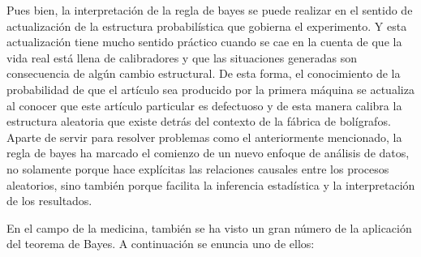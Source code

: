 \documentclass[10pt,openright]{book}\usepackage[]{graphicx}\usepackage[]{color}
\begin{document}
\begin{Eje}
Pues bien, la interpretación de la regla de bayes se puede realizar en el sentido de actualización de la estructura probabilística que gobierna el experimento. Y esta actualización tiene mucho sentido práctico cuando se cae en la cuenta de que la vida real está llena de calibradores y que las situaciones generadas son consecuencia de algún cambio estructural. De esta forma, el conocimiento de la probabilidad de que el artículo sea producido por la primera máquina se actualiza al conocer que este artículo particular es defectuoso y de esta manera calibra la estructura aleatoria que existe detrás del contexto de la fábrica de bolígrafos. Aparte de servir para resolver problemas como el anteriormente mencionado, la regla de bayes ha marcado el comienzo de un nuevo enfoque de análisis de datos, no solamente porque hace explícitas las relaciones causales entre los procesos aleatorios, sino también porque facilita la inferencia estadística y la interpretación de los resultados.
\end{Eje}

En el campo de la medicina, también se ha visto un gran número de la aplicación del teorema de Bayes. A continuación se enuncia uno de ellos:
\end{document}
